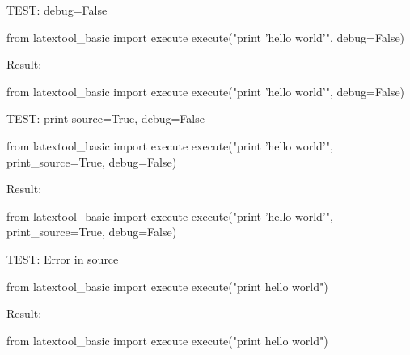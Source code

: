 \newpage
TEST: debug=False
\begin{console}
from latextool_basic import execute
execute("print 'hello world'", debug=False)
\end{console}
Result:
\begin{python}
from latextool_basic import execute
execute("print 'hello world'", debug=False)
\end{python}




\newpage
TEST: print source=True, debug=False
\begin{console}
from latextool_basic import execute
execute("print 'hello world'", print_source=True, debug=False)
\end{console}
Result:
\begin{python}
from latextool_basic import execute
execute("print 'hello world'", print_source=True, debug=False)
\end{python}




\newpage
TEST: Error in source
\begin{console}
from latextool_basic import execute
execute("print hello world")
\end{console}
Result:
\begin{python}
from latextool_basic import execute
execute("print hello world")
\end{python}
